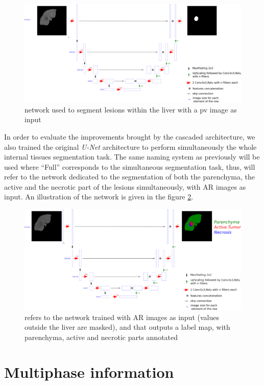 \begin{figure}[th!]
	\centering
	\includegraphics[width=0.9\linewidth]{../SemanticSeg/images/PV_Lesion}
	\caption{ network used to segment lesions within the liver with a \ac{pv} image as input}
	\label{CARS_PV_lesion_Fig}
\end{figure}


In order to evaluate the improvements brought by the cascaded
architecture, we also trained the original \emph{U-Net} architecture to
perform simultaneously the whole internal tissues segmentation task. The
same naming system as previously will be used where ``Full'' corresponds
to the simultaneous segmentation task, thus,  will refer to the
network dedicated to the segmentation of both the parenchyma, the active
and the necrotic part of the lesions simultaneously, with AR
images as input. An illustration of the network is given in the figure
\ref{CARS_ArFull_Fig}.

\begin{figure}[th!]
	\centering
	\includegraphics[width=0.9\linewidth]{../SemanticSeg/images/image23}
	\caption{ refers to the network trained with AR images as input (values outside the liver are masked), and that outputs a label map, with parenchyma, active and necrotic parts annotated}
	\label{CARS_ArFull_Fig}
\end{figure}


\section{Multiphase information}

